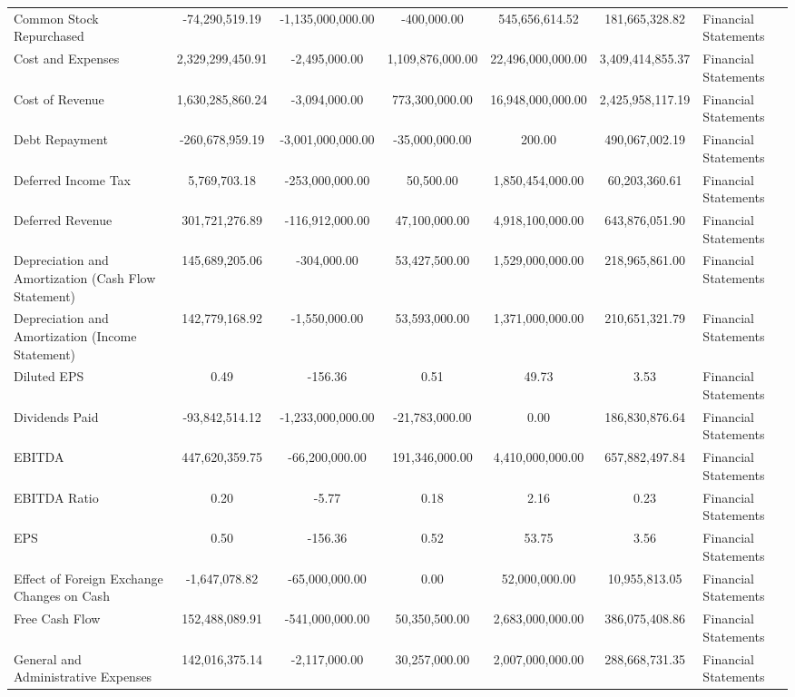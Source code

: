 \begin{tabular}{lccccc}
Common Stock Repurchased & -74,290,519.19 & -1,135,000,000.00 & -400,000.00 & 545,656,614.52 & 181,665,328.82 & Financial Statements \\
Cost and Expenses & 2,329,299,450.91 & -2,495,000.00 & 1,109,876,000.00 & 22,496,000,000.00 & 3,409,414,855.37 & Financial Statements \\
Cost of Revenue & 1,630,285,860.24 & -3,094,000.00 & 773,300,000.00 & 16,948,000,000.00 & 2,425,958,117.19 & Financial Statements \\
Debt Repayment & -260,678,959.19 & -3,001,000,000.00 & -35,000,000.00 & 200.00 & 490,067,002.19 & Financial Statements \\
Deferred Income Tax & 5,769,703.18 & -253,000,000.00 & 50,500.00 & 1,850,454,000.00 & 60,203,360.61 & Financial Statements \\
Deferred Revenue & 301,721,276.89 & -116,912,000.00 & 47,100,000.00 & 4,918,100,000.00 & 643,876,051.90 & Financial Statements \\
Depreciation and Amortization (Cash Flow Statement) & 145,689,205.06 & -304,000.00 & 53,427,500.00 & 1,529,000,000.00 & 218,965,861.00 & Financial Statements \\
Depreciation and Amortization (Income Statement) & 142,779,168.92 & -1,550,000.00 & 53,593,000.00 & 1,371,000,000.00 & 210,651,321.79 & Financial Statements \\
Diluted EPS & 0.49 & -156.36 & 0.51 & 49.73 & 3.53 & Financial Statements \\
Dividends Paid & -93,842,514.12 & -1,233,000,000.00 & -21,783,000.00 & 0.00 & 186,830,876.64 & Financial Statements \\
EBITDA & 447,620,359.75 & -66,200,000.00 & 191,346,000.00 & 4,410,000,000.00 & 657,882,497.84 & Financial Statements \\
EBITDA Ratio & 0.20 & -5.77 & 0.18 & 2.16 & 0.23 & Financial Statements \\
EPS & 0.50 & -156.36 & 0.52 & 53.75 & 3.56 & Financial Statements \\
Effect of Foreign Exchange Changes on Cash & -1,647,078.82 & -65,000,000.00 & 0.00 & 52,000,000.00 & 10,955,813.05 & Financial Statements \\
Free Cash Flow & 152,488,089.91 & -541,000,000.00 & 50,350,500.00 & 2,683,000,000.00 & 386,075,408.86 & Financial Statements \\
General and Administrative Expenses & 142,016,375.14 & -2,117,000.00 & 30,257,000.00 & 2,007,000,000.00 & 288,668,731.35 & Financial Statements \\

\end{tabular}
